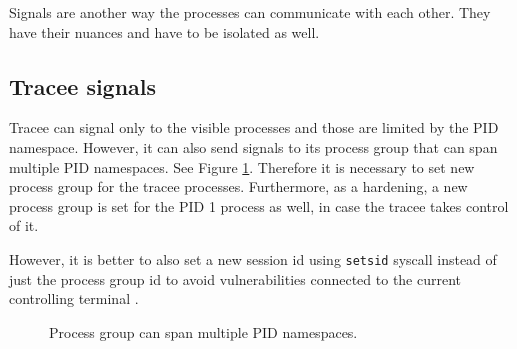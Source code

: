 \documentclass[en]{pracamgr}
\begin{document}
Signals are another way the processes can communicate with each other. They have their nuances and have to be isolated as well.

\subsection{Tracee signals}

Tracee can signal only to the visible processes and those are limited by the PID namespace. However, it can also send signals to its process group that can span multiple PID namespaces. See Figure \ref{fig:pgid_and_pid_namespace}. Therefore it is necessary to set new process group for the tracee processes. Furthermore, as a hardening, a new process group is set for the PID 1 process as well, in case the tracee takes control of it.

However, it is better to also set a new session id using \texttt{setsid} syscall instead of just the process group id to avoid vulnerabilities connected to the current controlling terminal \cite{bubblewrap_cve}.

\begin{figure}[h]
\tikzset{>=latex} %
\centering
{}
\caption{Process group can span multiple PID namespaces.}
\label{fig:pgid_and_pid_namespace}
\end{figure}
\end{document}
